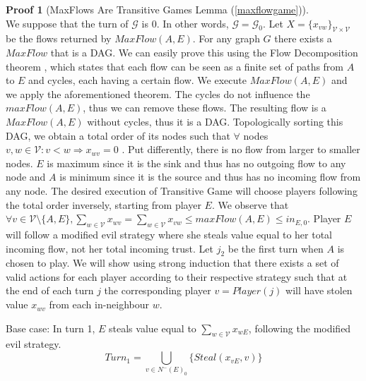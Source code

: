 \documentclass[11pt]{llncs}
\theoremstyle{definition}
\newtheorem{sepproof}{Proof}
\begin{document}
    \begin{sepproof}[MaxFlows Are Transitive Games Lemma (\ref{maxflowgame})] \ \\
    \label{maxflowgameproof}
       We suppose that the turn of $\mathcal{G}$ is 0. In other words, $\mathcal{G} = \mathcal{G}_0$. Let
       $X = \{x_{vw}\}_{\mathcal{V} \times \mathcal{V}}$ be the flows returned by $MaxFlow\left(A, E\right)$. For any graph
       $G$ there exists a $MaxFlow$ that is a DAG. We can easily prove this using the Flow Decomposition theorem
       \cite{amo}, which states that each flow can be seen as a finite set of paths from $A$ to $E$ and cycles, each
       having a certain flow. We execute $MaxFlow\left(A, E\right)$ and we apply the aforementioned theorem. The
       cycles do not influence the $maxFlow\left(A, E\right)$, thus we can remove these flows. The resulting flow is a
       $MaxFlow\left(A, E\right)$ without cycles, thus it is a DAG. Topologically sorting this DAG, we obtain a total order
       of its nodes such that $\forall$ nodes $v, w \in \mathcal{V} : v < w \Rightarrow x_{wv} = 0$ \cite{clrs}. Put
       differently, there is no flow from larger to smaller nodes. $E$ is maximum since it is the sink and thus has no
       outgoing flow to any node and $A$ is minimum since it is the source and thus has no incoming flow from any node. The
       desired execution of Transitive Game will choose players following the total order inversely, starting from player
       $E$. We observe that $\forall v \in \mathcal{V} \setminus \{A, E\}, \sum\limits_{w \in \mathcal{V}}x_{wv} =
       \sum\limits_{w \in \mathcal{V}}x_{vw} \leq maxFlow\left(A, E\right) \leq in_{E, 0}$. Player $E$ will follow a modified
       evil strategy where she steals value equal to her total incoming flow, not her total incoming trust. Let $j_2$ be the
       first turn when $A$ is chosen to play. We will show using strong induction that there exists a set of valid actions
       for each player according to their respective strategy such that at the end of each turn $j$ the corresponding player
       $v = Player\left(j\right)$ will have stolen value $x_{wv}$ from each in-neighbour $w$.

       Base case: In turn 1, $E$ steals value equal to $\sum\limits_{w \in \mathcal{V}}x_{wE}$, following the modified evil
       strategy.
       \begin{equation*}
          Turn_1 = \bigcup\limits_{v \in N^{-}\left(E\right)_0}\{Steal\left(x_{vE}, v\right)\}
       \end{equation*}


\end{sepproof}
\end{document}
